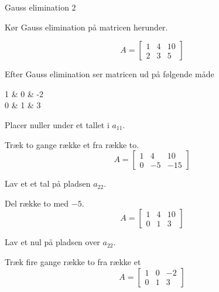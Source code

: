 \documentclass{article}
\begin{document}
\begin{exercise}{Gauss elimination 2}
	
	
	Kør Gauss elimination på matricen herunder.
	
	\[
	A = \left[\begin{array}{rr|r}
	1 & 4 & 10 \\ 
	2 & 3 & 5
	\end{array} \right]
	\]
	
	Efter Gauss elimination ser matricen ud på følgende måde
	\begin{answermatrix}
		1 & 0 & -2 \\
		0 & 1 & 3
	\end{answermatrix}
	
	\hint
	Placer nuller under et tallet i $a_{11}$.
	
	\hint
	Træk to gange række et fra række to.
	\[
	A = \left[\begin{array}{rr|r}
	1 & 4 & 10 \\ 
	0 & -5 & -15
	\end{array} \right]
	\]
	
	\hint
	Lav et et tal på pladsen $a_{22}$.
	
	\hint
	Del række to med $-5$.
	\[
	A = \left[\begin{array}{rr|r}
	1 & 4 & 10 \\ 
	0 & 1 & 3
	\end{array} \right]
	\]
	
	
	\hint
	Lav et nul på pladsen over $a_{22}$.
	
	\hint
	Træk fire gange række to fra række et
	\[
	A = \left[\begin{array}{rr|r}
	1 & 0 & -2 \\ 
	0 & 1 & 3
	\end{array} \right]
	\]
	
	
\end{exercise}

\newpage
\end{document}
